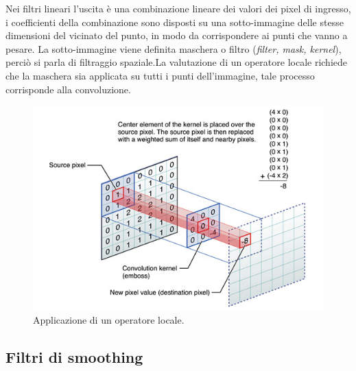Nei filtri lineari l'uscita è una combinazione lineare dei valori dei 
pixel di ingresso, i coefficienti della combinazione sono disposti su una 
sotto-immagine delle stesse dimensioni del vicinato del punto, in
modo da corrispondere ai punti che vanno a pesare.
La sotto-immagine viene definita maschera o filtro (\emph{filter, mask, 
kernel}), perciò si parla di filtraggio spaziale.La valutazione di un 
operatore locale richiede che la maschera sia applicata su tutti i punti 
dell'immagine, tale processo corrisponde alla convoluzione. 

\begin{figure}
\centering
\includegraphics[width=.8\textwidth]{img/convoluzione.png}
\caption{Applicazione di un operatore locale.}
\label{fig:convoluzione}
\end{figure}

\subsection{Filtri di smoothing}

